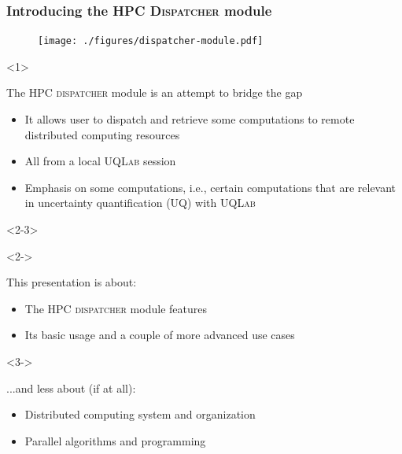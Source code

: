 \documentclass[]{rsuqbeamernew}
\begin{document}
\begin{frame}
\frametitle{Introducing the HPC \textsc{Dispatcher} module}

\begin{figure}[htbp]
  \texttt{[image: ./figures/dispatcher-module.pdf]}
\end{figure}    

\begin{onlyenv}<1>
\begin{block}{The HPC \textsc{dispatcher} module is an attempt to bridge the gap}
  \begin{itemize}
    \item It allows user to dispatch and retrieve {\altx some computations}
          to remote distributed computing resources
    \item All from a local \textsc{UQLab} session
    \item Emphasis on {\altx some computations}, i.e.,
          certain computations that are relevant in uncertainty quantification (UQ)
          with \textsc{UQLab}
  \end{itemize}
\end{block}
\end{onlyenv}

\begin{onlyenv}<2-3>
  \begin{onslide}<2->
  \begin{block}{This presentation is about:}
    \begin{itemize}
      \item The HPC \textsc{dispatcher} module features
      \item Its basic usage and a couple of more advanced use cases
    \end{itemize}
  \end{block}
\end{onslide}

\begin{onslide}<3->
  \begin{block}{...and less about (if at all):}
    \begin{itemize}
      \item Distributed computing system and organization
      \item Parallel algorithms and programming
    \end{itemize}
  \end{block}
\end{onslide}
\end{onlyenv}

\end{frame}
\end{document}
